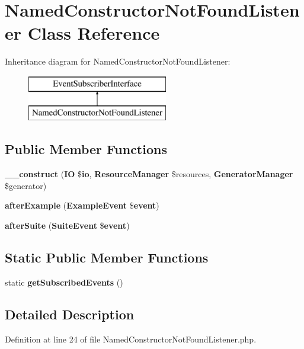 \section{Named\+Constructor\+Not\+Found\+Listener Class Reference}
\label{class_php_spec_1_1_listener_1_1_named_constructor_not_found_listener}
Inheritance diagram for Named\+Constructor\+Not\+Found\+Listener\+:\begin{figure}[H]
\begin{center}
\leavevmode
\includegraphics[height=2.000000cm]{class_php_spec_1_1_listener_1_1_named_constructor_not_found_listener}
\end{center}
\end{figure}
\subsection*{Public Member Functions}
\begin{DoxyCompactItemize}
\item 
{\bf \+\_\+\+\_\+construct} ({\bf I\+O} \${\bf io}, {\bf Resource\+Manager} \$resources, {\bf Generator\+Manager} \$generator)
\item 
{\bf after\+Example} ({\bf Example\+Event} \${\bf event})
\item 
{\bf after\+Suite} ({\bf Suite\+Event} \${\bf event})
\end{DoxyCompactItemize}
\subsection*{Static Public Member Functions}
\begin{DoxyCompactItemize}
\item 
static {\bf get\+Subscribed\+Events} ()
\end{DoxyCompactItemize}


\subsection{Detailed Description}


Definition at line 24 of file Named\+Constructor\+Not\+Found\+Listener.\+php.



